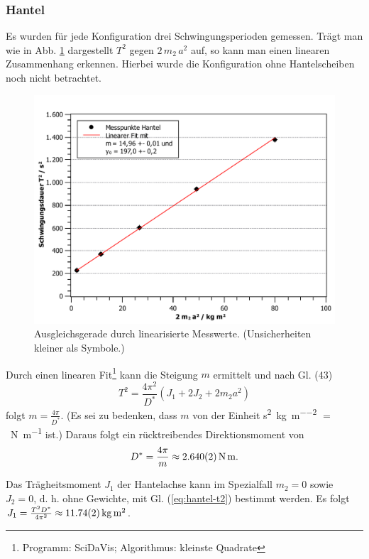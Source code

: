 \subsubsection*{Hantel}
Es wurden für jede Konfiguration drei Schwingungsperioden gemessen.
Trägt man wie in Abb. \ref{fig:hantel-fit} dargestellt $T^2$ gegen $2 \, m_2 \, a^2$ auf, so kann man einen linearen Zusammenhang erkennen.
Hierbei wurde die Konfiguration ohne Hantelscheiben noch nicht betrachtet.
\begin{figure}[ht]
	\includegraphics[width=\textwidth]{Torsion_Hantel_linear.pdf}
	\caption{Ausgleichsgerade durch linearisierte Messwerte. (Unsicherheiten kleiner als Symbole.)}
	\label{fig:hantel-fit}
\end{figure}
Durch einen linearen Fit\footnote{Programm: SciDaVis; Algorithmus: kleinste Quadrate} kann die Steigung $m$ ermittelt und nach Gl. (43) 
\begin{equation}
	\label{eq:hantel-t2}
	T^2 = \frac{4\pi^2}{D^*} (J_1 + 2 J_2 + 2 m_2 a^2)
\end{equation}
folgt $m = \frac{4\pi}{D^*}$.
(Es sei zu bedenken, dass $m$ von der Einheit \si{\second\squared\per\kilogram\per\meter\squared} $=$ \si{\per\newton\per\meter} ist.)
Daraus folgt ein rücktreibendes Direktionsmoment von 
\begin{equation}
	D^* = \frac{4\pi}{m} \approx \SI{2,640+-0,002}{\newton\meter}.
\end{equation}

Das Trägheitsmoment $J_1$ der Hantelachse kann im Spezialfall $m_2 = 0$ sowie $J_2 = 0$, d. h. ohne Gewichte, mit Gl. (\ref{eq:hantel-t2}) bestimmt werden.
Es folgt $J_1 = \frac{T^2 D^*}{4\pi^2} \approx \SI{11,74 +- 0,02}{\kilogram\meter\squared}$.

